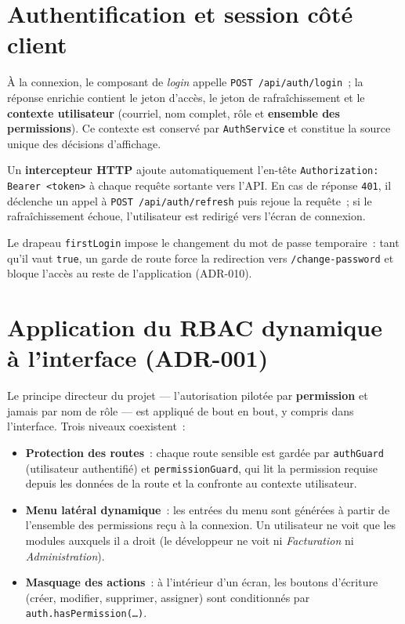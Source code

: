\section{Authentification et session côté client}

À la connexion, le composant de \emph{login} appelle \texttt{POST /api/auth/login}~; la réponse
enrichie contient le jeton d'accès, le jeton de rafraîchissement et le \textbf{contexte utilisateur}
(courriel, nom complet, rôle et \textbf{ensemble des permissions}). Ce contexte est conservé par
\texttt{AuthService} et constitue la source unique des décisions d'affichage.

Un \textbf{intercepteur HTTP} ajoute automatiquement l'en-tête \texttt{Authorization: Bearer~<token>}
à chaque requête sortante vers l'API. En cas de réponse \texttt{401}, il déclenche un appel à
\texttt{POST /api/auth/refresh} puis rejoue la requête~; si le rafraîchissement échoue, l'utilisateur
est redirigé vers l'écran de connexion.

Le drapeau \texttt{firstLogin} impose le changement du mot de passe temporaire~: tant qu'il vaut
\texttt{true}, un garde de route force la redirection vers \texttt{/change-password} et bloque l'accès
au reste de l'application (ADR-010).

\section{Application du RBAC dynamique à l'interface (ADR-001)}

Le principe directeur du projet --- l'autorisation pilotée par \textbf{permission} et jamais par nom
de rôle --- est appliqué de bout en bout, y compris dans l'interface. Trois niveaux coexistent~:

\begin{itemize}
  \item \textbf{Protection des routes}~: chaque route sensible est gardée par \texttt{authGuard}
        (utilisateur authentifié) et \texttt{permissionGuard}, qui lit la permission requise depuis
        les données de la route et la confronte au contexte utilisateur.
  \item \textbf{Menu latéral dynamique}~: les entrées du menu sont générées à partir de l'ensemble
        des permissions reçu à la connexion. Un utilisateur ne voit que les modules auxquels il a
        droit (le développeur ne voit ni \emph{Facturation} ni \emph{Administration}).
  \item \textbf{Masquage des actions}~: à l'intérieur d'un écran, les boutons d'écriture
        (créer, modifier, supprimer, assigner) sont conditionnés par \texttt{auth.hasPermission(\dots)}.
\end{itemize}


